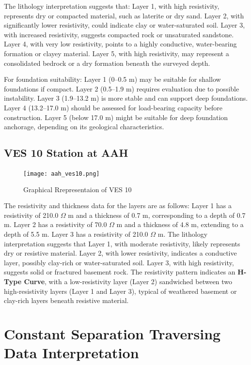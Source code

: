 \documentclass[12pt,a4paper]{report}
\begin{document}
The lithology interpretation suggests that: Layer 1, with high resistivity, represents dry or compacted material, such as laterite or dry sand.  
Layer 2, with significantly lower resistivity, could indicate clay or water-saturated soil.  
Layer 3, with increased resistivity, suggests compacted rock or unsaturated sandstone.  
Layer 4, with very low resistivity, points to a highly conductive, water-bearing formation or clayey material.  
Layer 5, with high resistivity, may represent a consolidated bedrock or a dry formation beneath the surveyed depth.  

For foundation suitability: Layer 1 (0--0.5 m) may be suitable for shallow foundations if compact.  
Layer 2 (0.5--1.9 m) requires evaluation due to possible instability.  
Layer 3 (1.9--13.2 m) is more stable and can support deep foundations.  
Layer 4 (13.2--17.0 m) should be assessed for load-bearing capacity before construction.  
Layer 5 (below 17.0 m) might be suitable for deep foundation anchorage, depending on its geological characteristics.  

\subsection{VES 10 Station at AAH}

\begin{figure}[H]
    \centering
    \texttt{[image: aah\_ves10.png]}
    \caption{Graphical Rrepresentaion of VES 10}
    \label{fig:AAH_VES_10_Curve}
\end{figure}
The resistivity and thickness data for the layers are as follows: Layer 1 has a resistivity of 210.0 $\Omega$ m and a thickness of 0.7 m, corresponding to a depth of 0.7 m. Layer 2 has a resistivity of 70.0 $\Omega$ m and a thickness of 4.8 m, extending to a depth of 5.5 m. Layer 3 has a resistivity of 210.0 $\Omega$ m. The lithology interpretation suggests that Layer 1, with moderate resistivity, likely represents dry or resistive material. Layer 2, with lower resistivity, indicates a conductive layer, possibly clay-rich or water-saturated soil. Layer 3, with high resistivity, suggests solid or fractured basement rock. The resistivity pattern indicates an \textbf{H-Type Curve}, with a low-resistivity layer (Layer 2) sandwiched between two high-resistivity layers (Layer 1 and Layer 3), typical of weathered basement or clay-rich layers beneath resistive material.

\section{Constant Separation Traversing Data Interpretation}
\end{document}
